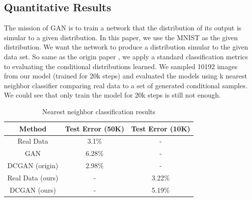 \subsection{Quantitative Results}
The mission of GAN is to train a network that the distribution of its output is simular to a given distribution. In this paper, we use the MNIST as the given distribution. We want the network to produce a distribution simular to the given data set. So same as the origin paper \cite{DCGAN}, we apply a standard classification metrics to evaluating the conditional distributions learned. We sampled 10192 images from our model (trained for 20k steps) and evaluated the models using k nearest neighbor classifier comparing real data to a set of generated conditional samples. We could see that only train the model for 20k steps is still not enough. 

\begin{table}[h]
\small
\begin{center}
\begin{tabular}{ | c | c | c | }
\hline
Method & Test Error (50K) & Test Error (10K) \\ \hline
Real Data & 3.1\% & -  \\
GAN & 6.28\% & -  \\
DCGAN (origin) & 2.98\% & -  \\ \hline
Real Data (ours) & - & 3.22\% \\
DCGAN (ours) & - & 5.19\% \\ \hline
\end{tabular}


\caption{\label{results} Nearest neighbor classification results 
%
%
}
\end{center}
\vspace{-0.45cm}
\end{table}

%
%
%
%
%
%
%

%
%
%
%
%
%
%
%
%
%
%

